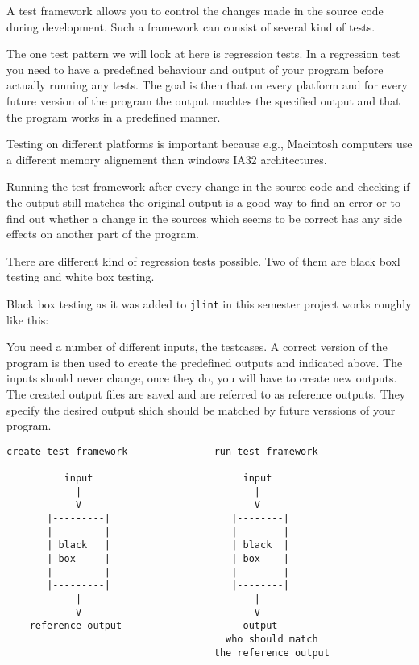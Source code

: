 \documentclass[11pt,twoside,a4paper,draft]{article}
\begin{document}
A test framework allows you to control the changes made in the source code
during development. Such a framework can consist of several kind of tests.


The one test pattern we will look at here is regression tests. In a regression 
test you need to have a predefined behaviour and output of your program before
actually running any tests. The goal is then that on every platform and for every future version of the program the output machtes the specified output and that the program works in a predefined manner.


Testing on different platforms is important because e.g., Macintosh computers use a different memory alignement than windows IA32 architectures.


Running the test framework after every change in the source code and checking
if the output still matches the original output is a good way to find an error
or to find out whether a change in the sources which seems to be correct has 
any side effects on another part of the program.


There are different kind of regression tests possible. Two of them are black
boxl testing and white box testing.


Black box testing as it was added to \texttt{jlint} in this semester project 
works roughly like this:

You need a number of different inputs, the testcases. A correct version of the 
program is then used to create the predefined outputs and indicated above. The inputs should never change, once they do, you will have to create new outputs.
The created output files are saved and are referred to as reference outputs.
They specify the desired output shich should be matched by future verssions of
your program.

\begin{verbatim}
create test framework               run test framework

          input                          input
            |                              |
            V                              V
       |---------|                     |--------|
       |         |                     |        |
       | black   |                     | black  |
       | box     |                     | box    |
       |         |                     |        |
       |---------|                     |--------|
            |                              |
            V                              V
    reference output                     output
                                      who should match
                                    the reference output
\end{verbatim}
\end{document}
